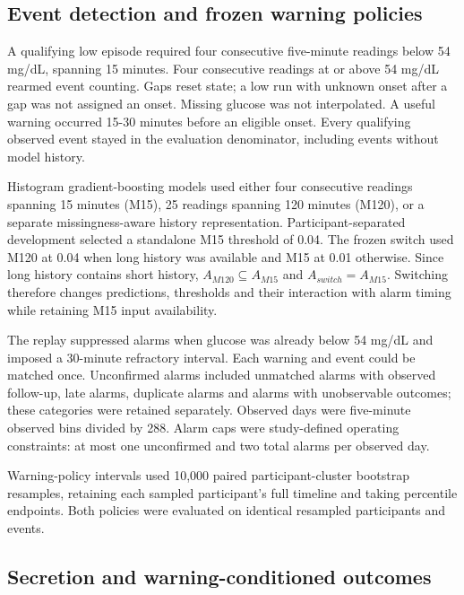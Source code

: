 \documentclass[
  american,
  11pt,
  letterpaper,
]{article}
\begin{document}
\subsection{Event detection and frozen warning
policies}\label{event-detection-and-frozen-warning-policies}

A qualifying low episode required four consecutive five-minute readings
below 54 mg/dL, spanning 15 minutes. Four consecutive readings at or
above 54 mg/dL rearmed event counting. Gaps reset state; a low run with
unknown onset after a gap was not assigned an onset. Missing glucose was
not interpolated. A useful warning occurred 15-30 minutes before an
eligible onset. Every qualifying observed event stayed in the evaluation
denominator, including events without model history.

Histogram gradient-boosting models used either four consecutive readings
spanning 15 minutes (M15), 25 readings spanning 120 minutes (M120), or a
separate missingness-aware history representation. Participant-separated
development selected a standalone M15 threshold of 0.04. The frozen
switch used M120 at 0.04 when long history was available and M15 at 0.01
otherwise. Since long history contains short history,
\(A_{M120}\subseteq A_{M15}\) and \(A_{switch}=A_{M15}\). Switching
therefore changes predictions, thresholds and their interaction with
alarm timing while retaining M15 input availability.

The replay suppressed alarms when glucose was already below 54 mg/dL and
imposed a 30-minute refractory interval. Each warning and event could be
matched once. Unconfirmed alarms included unmatched alarms with observed
follow-up, late alarms, duplicate alarms and alarms with unobservable
outcomes; these categories were retained separately. Observed days were
five-minute observed bins divided by 288. Alarm caps were study-defined
operating constraints: at most one unconfirmed and two total alarms per
observed day.

Warning-policy intervals used 10,000 paired participant-cluster
bootstrap resamples, retaining each sampled participant's full timeline
and taking percentile endpoints. Both policies were evaluated on
identical resampled participants and events.

\subsection{Secretion and warning-conditioned
outcomes}\label{secretion-and-warning-conditioned-outcomes}
\end{document}
